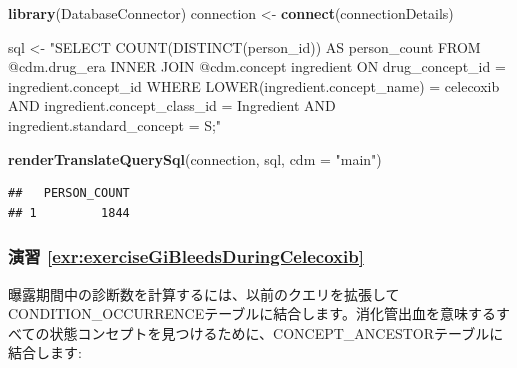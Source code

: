 \documentclass[
  11pt]{book}
\newenvironment{Shaded}{\begin{snugshade}}{\end{snugshade}}
\newcommand{\AttributeTok}[1]{\textcolor[rgb]{0.13,0.29,0.53}{#1}}
\newcommand{\FunctionTok}[1]{\textcolor[rgb]{0.13,0.29,0.53}{\textbf{#1}}}
\newcommand{\NormalTok}[1]{#1}
\newcommand{\OtherTok}[1]{\textcolor[rgb]{0.56,0.35,0.01}{#1}}
\newcommand{\StringTok}[1]{\textcolor[rgb]{0.31,0.60,0.02}{#1}}
\theoremstyle{definition}
\theoremstyle{definition}
\theoremstyle{definition}
\theoremstyle{definition}
\theoremstyle{remark}
\begin{document}
\begin{Shaded}
\begin{Highlighting}[]
\FunctionTok{library}\NormalTok{(DatabaseConnector)}
\NormalTok{connection }\OtherTok{\textless{}{-}} \FunctionTok{connect}\NormalTok{(connectionDetails)}

\NormalTok{sql }\OtherTok{\textless{}{-}} \StringTok{"SELECT COUNT(DISTINCT(person\_id)) AS person\_count}
\StringTok{FROM @cdm.drug\_era}
\StringTok{INNER JOIN @cdm.concept ingredient}
\StringTok{  ON drug\_concept\_id = ingredient.concept\_id}
\StringTok{WHERE LOWER(ingredient.concept\_name) = \textquotesingle{}celecoxib\textquotesingle{}}
\StringTok{  AND ingredient.concept\_class\_id = \textquotesingle{}Ingredient\textquotesingle{}}
\StringTok{  AND ingredient.standard\_concept = \textquotesingle{}S\textquotesingle{};"}

\FunctionTok{renderTranslateQuerySql}\NormalTok{(connection, sql, }\AttributeTok{cdm =} \StringTok{"main"}\NormalTok{)}
\end{Highlighting}
\end{Shaded}

\begin{verbatim}
##   PERSON_COUNT
## 1         1844
\end{verbatim}

\subsubsection*{演習 \ref{exr:exerciseGiBleedsDuringCelecoxib}}\label{ux6f14ux7fd2-refexrexercisegibleedsduringcelecoxib}

曝露期間中の診断数を計算するには、以前のクエリを拡張してCONDITION\_OCCURRENCEテーブルに結合します。消化管出血を意味するすべての状態コンセプトを見つけるために、CONCEPT\_ANCESTORテーブルに結合します:
\end{document}
